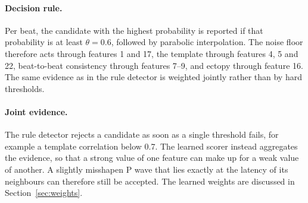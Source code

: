 \documentclass[11pt,a4paper]{article}
\begin{document}
\paragraph{Decision rule.} Per beat, the candidate with the highest probability is reported if that probability is at least $\theta = 0.6$, followed by parabolic interpolation. The noise floor therefore acts through features 1 and 17, the template through features 4, 5 and 22, beat-to-beat consistency through features 7--9, and ectopy through feature 16. The same evidence as in the rule detector is weighted jointly rather than by hard thresholds.

\paragraph{Joint evidence.} The rule detector rejects a candidate as soon as a single threshold fails, for example a template correlation below 0.7. The learned scorer instead aggregates the evidence, so that a strong value of one feature can make up for a weak value of another. A slightly misshapen P wave that lies exactly at the latency of its neighbours can therefore still be accepted. The learned weights are discussed in Section~\ref{sec:weights}.
\end{document}
